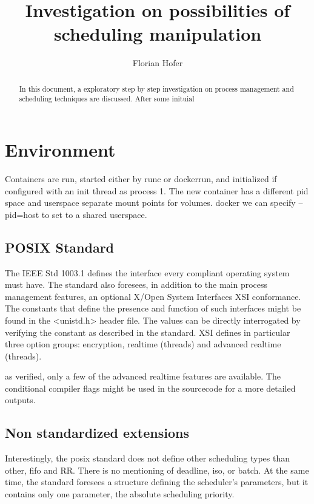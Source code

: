 \documentclass[]{scrartcl}
\title{Investigation on possibilities of scheduling manipulation}
\author{Florian Hofer}
\begin{document}
\maketitle

\begin{abstract}
In this document, a exploratory step by step investigation on process management and scheduling techniques are discussed.
After some inituial 
\end{abstract}

\section{Environment}

Containers are run, started either by runc or dockerrun, and initialized if configured with an init thread as process 1. 
The new container has a different pid space and userspace
separate mount points for volumes. docker we can specify --pid=host to set to a shared userspace.

\subsection{POSIX Standard}

The IEEE Std 1003.1 defines the interface every compliant operating system must have. The standard also foresees, in addition to the main process management features, an optional X/Open System Interfaces XSI conformance.
The constants that define the presence and function of such interfaces might be found in the <unistd.h> header file. 
The values can be directly interrogated by verifying the constant as described in the standard.
XSI defines in particular three option groups: encryption, realtime (threads) and advanced realtime (threads). 

as verified, only a few of the advanced realtime features are available. 
The conditional compiler flags might be used in the sourcecode for a more detailed outputs. 

\subsection{Non standardized extensions}

Interestingly, the posix standard does not define other scheduling types than other, fifo and RR. 
There is no mentioning of deadline, iso, or batch. 
At the same time, the standard foresees a structure defining the scheduler's parameters, but it contains only one parameter, the absolute scheduling priority.
\end{document}
